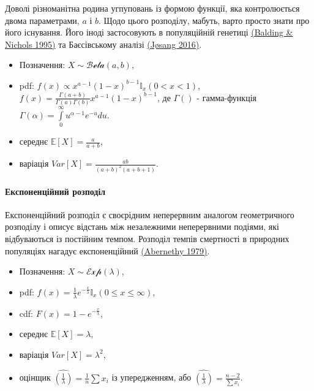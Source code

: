 \documentclass[
  11pt,
]{book}
\begin{document}
Доволі різноманітна родина угпуповань із формою функції, яка контролюється двома параметрами, \(a\) і \(b\). Щодо цього розподілу, мабуть, варто просто знати про його існування. Його іноді застосовують в популяційній генетиці \href{https://doi.org/10.1007\%2FBF01441146}{(Balding \& Nichols 1995)} та Баєсівському аналізі \href{https://doi.org/10.1109/MFI.2016.7849531}{(Jøsang 2016)}.

\begin{itemize}
\item
  Позначення: \(X \sim \mathcal{Beta}(a, b)\),
\item
  pdf: \(f(x) \propto x^{a - 1} (1-x)^{b-1} \mathbb{I}_x(0 < x < 1)\), \(f(x) = \frac{\Gamma (a + b)}{\Gamma (a) \Gamma (b)} x^{a - 1} (1 - x)^{b - 1}\), де \(\Gamma()\) - гамма-функція \(\Gamma(\alpha) = \int \limits_0^{\infty} u^{\alpha - 1} e^{-u} du\).
\item
  середнє \(\mathbb{E} [X] = \frac{a}{a + b}\),
\item
  варіація \(Var[X] = \frac{ab}{(a+b)^2 (a+b+1)}\).
\end{itemize}

\paragraph{Експоненційний розподіл}\label{ux435ux43aux441ux43fux43eux43dux435ux43dux446ux456ux439ux43dux438ux439-ux440ux43eux437ux43fux43eux434ux456ux43b}

Експоненційний розподіл є своєрідним неперервним аналогом геометричного розподілу і описує відстань між незалежними неперервними подіями, які відбуваються із постійним темпом. Розподіл темпів смертності в природних популяціях нагадує експоненційний \href{https://doi.org/10.1016/0022-5193(79)90098-5}{(Abernethy 1979)}.

\begin{itemize}
\item
  Позначення: \(X \sim \mathcal{Exp}(\lambda)\),
\item
  pdf: \(f(x) = \frac{1}{\lambda} e^{-\frac{x}{\lambda}} \mathbb{I}_x (0 \leq x \leq \infty)\),
\item
  cdf: \(F(x) = 1 - e^{-\frac{x}{\lambda}}\),
\item
  середнє \(\mathbb{E} [X] = \lambda\),
\item
  варіація \(Var[X] = \lambda^2\),
\item
  оцінщик \(\hat{(\frac{1}{\lambda})} = \frac{1}{n} \sum x_i\) із упередженням, або \(\hat{(\frac{1}{\lambda})} = \frac{n-2}{\sum x_i}\).
\end{itemize}
\end{document}

